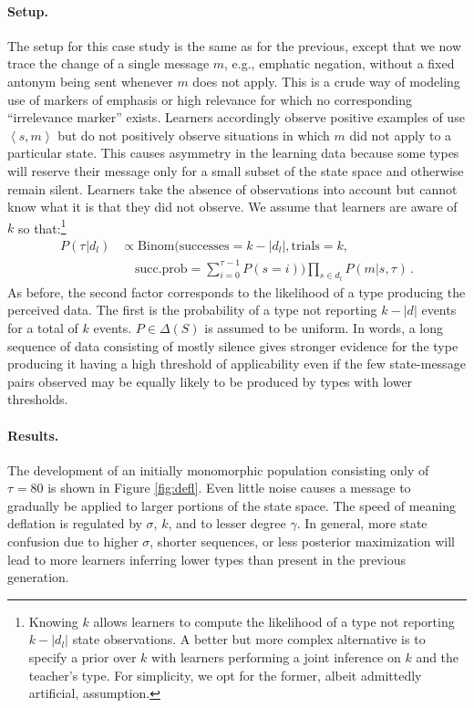 \documentclass[10pt,a4paper]{article}
\newcommand{\tuple}[1]{\ensuremath{\left\langle #1 \right\rangle}}
\newcommand{\type}[1]{\ensuremath{\tau_{#1}}}
\newcommand{\postparameter}{\ensuremath{\gamma}}
\begin{document}
\paragraph{Setup.} The setup for this case study is the same as for the previous, except that
we now trace the change of a single message $m$, e.g., emphatic negation, without a fixed
antonym being sent whenever $m$ does not apply. This is a crude way of modeling use of
markers of emphasis or high relevance for which no corresponding ``irrelevance marker''
exists. Learners accordingly observe positive examples of use $\tuple{s,m}$ but do not
positively observe situations in which $m$ did not apply to a particular state. This causes
asymmetry in the learning data because some types will reserve their message only for a
small subset of the state space and otherwise remain silent. Learners take the absence of
observations into account but cannot know what it is that they did not observe. We assume that
learners are aware of $k$ so that:\footnote{Knowing $k$ allows learners to compute the
  likelihood of a type not reporting $k -|d_l|$ state observations. A better but more complex
  alternative is to specify a prior over $k$ with learners performing a joint inference on $k$
  and the teacher's type. For simplicity, we opt for the former, albeit admittedly artificial,
  assumption.}
\begin{align*}
  P(\type{} | d_l) & \propto \text{Binom}(\text{successes} =
  k-|d_l|, \text{trials} = k, \\
  & 
  \ \ \ \ \ \text{succ.prob} = \sum_{i=0}^{\type{}-1} P(s = i)) \prod_{s \in d_l} P(m|s,\type{})\,.
\end{align*}
As before, the second factor corresponds to the
likelihood of a type producing the perceived data.  The first is the probability of a type not
reporting $k-|d|$ events for a total of $k$ events. $P \in \Delta(S)$ is assumed to be
uniform. In words, a long sequence of data consisting of mostly silence gives stronger evidence
for the type producing it having a high threshold of applicability even if the few state-message pairs observed may be equally likely to be produced by types with lower thresholds.

\paragraph{Results.} The development of an initially monomorphic population consisting only of
$\type{} = 80$ is shown in Figure \ref{fig:defl}. Even little noise causes a message to gradually be
applied to larger portions of the state space. The speed of meaning deflation is regulated by
$\sigma$, $k$, and to lesser degree $\postparameter$. In general, more state confusion due to higher
$\sigma$, shorter sequences, or less posterior maximization will lead to more learners
inferring lower types than present in the previous generation.
\end{document}
